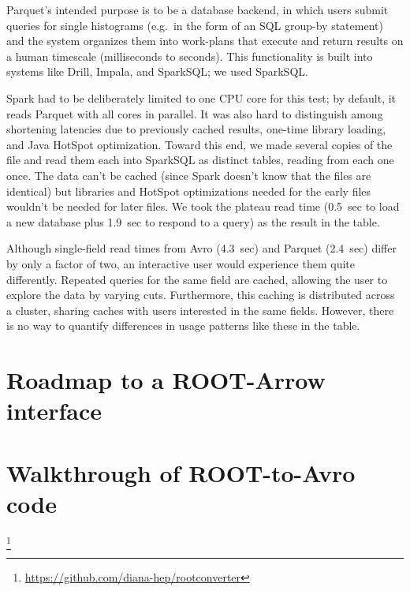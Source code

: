 \documentclass{article}
\begin{document}
Parquet's intended purpose is to be a database backend, in which users submit queries for single histograms (e.g.\ in the form of an SQL group-by statement) and the system organizes them into work-plans that execute and return results on a human timescale (milliseconds to seconds). This functionality is built into systems like Drill, Impala, and SparkSQL; we used SparkSQL.

Spark had to be deliberately limited to one CPU core for this test; by default, it reads Parquet with all cores in parallel. It was also hard to distinguish among shortening latencies due to previously cached results, one-time library loading, and Java HotSpot optimization. Toward this end, we made several copies of the file and read them each into SparkSQL as distinct tables, reading from each one once. The data can't be cached (since Spark doesn't know that the files are identical) but libraries and HotSpot optimizations needed for the early files wouldn't be needed for later files. We took the plateau read time (0.5~sec to load a new database plus 1.9~sec to respond to a query) as the result in the table.

Although single-field read times from Avro (4.3~sec) and Parquet (2.4~sec) differ by only a factor of two, an interactive user would experience them quite differently. Repeated queries for the same field are cached, allowing the user to explore the data by varying cuts. Furthermore, this caching is distributed across a cluster, sharing caches with users interested in the same fields. However, there is no way to quantify differences in usage patterns like these in the table.

\section*{Roadmap to a ROOT-Arrow interface}







\section*{Walkthrough of ROOT-to-Avro code}

\footnote{\url{https://github.com/diana-hep/rootconverter}}
\end{document}
